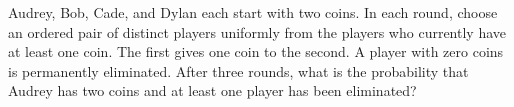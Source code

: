 Audrey, Bob, Cade, and Dylan each start with two coins. In each round, choose an ordered pair of distinct players uniformly from the players who currently have at least one coin. The first gives one coin to the second. A player with zero coins is permanently eliminated. After three rounds, what is the probability that Audrey has two coins and at least one player has been eliminated?
